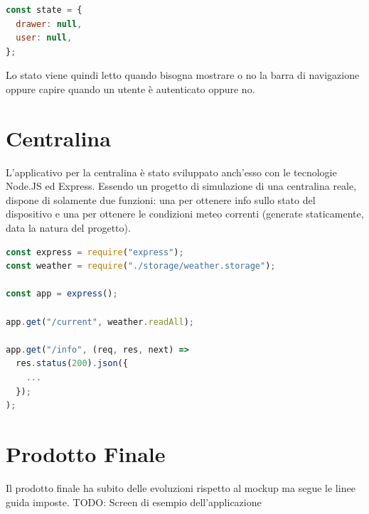 \begin{lstlisting}[language=Javascript]
const state = {
  drawer: null,
  user: null,
};
\end{lstlisting}

Lo stato viene quindi letto quando bisogna mostrare o no la barra di navigazione oppure capire quando un utente è autenticato oppure no.

\section{Centralina}
L'applicativo per la centralina è stato sviluppato anch'esso con le tecnologie Node.JS ed Express. Essendo un progetto di simulazione di una centralina reale, dispone di solamente due funzioni: una per ottenere info sullo stato del dispositivo e una per ottenere le condizioni meteo correnti (generate staticamente, data la natura del progetto).

\begin{lstlisting}[language=Javascript]
const express = require("express");
const weather = require("./storage/weather.storage");

const app = express();

app.get("/current", weather.readAll);

app.get("/info", (req, res, next) =>
  res.status(200).json({
    ...
  });
);
\end{lstlisting}

\section{Prodotto Finale}
\label{prodottofinale}
Il prodotto finale ha subito delle evoluzioni rispetto al mockup ma segue le linee
guida imposte.
TODO: Screen di esempio dell'applicazione